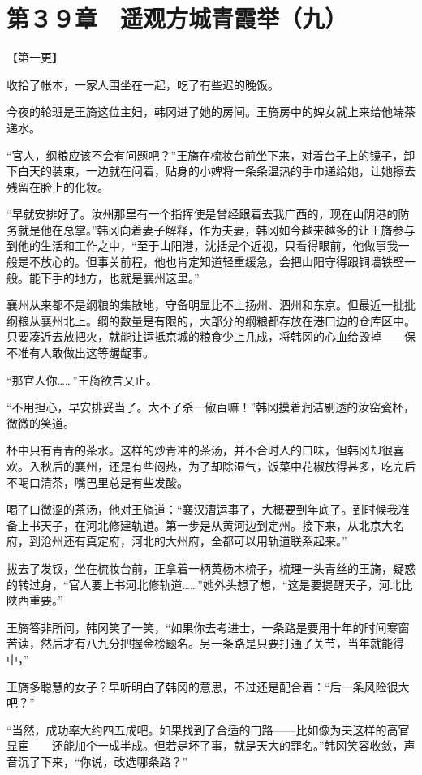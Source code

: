 \section{第３９章　遥观方城青霞举（九）}

【第一更】

收拾了帐本，一家人围坐在一起，吃了有些迟的晚饭。

今夜的轮班是王旖这位主妇，韩冈进了她的房间。王旖房中的婢女就上来给他端茶递水。

“官人，纲粮应该不会有问题吧？”王旖在梳妆台前坐下来，对着台子上的镜子，卸下白天的装束，一边就在问着，贴身的小婢将一条条温热的手巾递给她，让她擦去残留在脸上的化妆。

“早就安排好了。汝州那里有一个指挥使是曾经跟着去我广西的，现在山阴港的防务就是他在总掌。”韩冈向着妻子解释，作为夫妻，韩冈如今越来越多的让王旖参与到他的生活和工作之中，“至于山阳港，沈括是个近视，只看得眼前，他做事我一般是不放心的。但事关前程，他也肯定知道轻重缓急，会把山阳守得跟铜墙铁壁一般。能下手的地方，也就是襄州这里。”

襄州从来都不是纲粮的集散地，守备明显比不上扬州、泗州和东京。但最近一批批纲粮从襄州北上。纲的数量是有限的，大部分的纲粮都存放在港口边的仓库区中。只要凑近去放把火，就能让运抵京城的粮食少上几成，将韩冈的心血给毁掉——保不准有人敢做出这等龌龊事。

“那官人你……”王旖欲言又止。

“不用担心，早安排妥当了。大不了杀一儆百嘛！”韩冈摸着润洁剔透的汝窑瓷杯，微微的笑道。

杯中只有青青的茶水。这样的炒青冲的茶汤，并不合时人的口味，但韩冈却很喜欢。入秋后的襄州，还是有些闷热，为了却除湿气，饭菜中花椒放得甚多，吃完后不喝口清茶，嘴巴里总是有些发酸。

喝了口微涩的茶汤，他对王旖道：“襄汉漕运事了，大概要到年底了。到时候我准备上书天子，在河北修建轨道。第一步是从黄河边到定州。接下来，从北京大名府，到沧州还有真定府，河北的大州府，全都可以用轨道联系起来。”

拔去了发钗，坐在梳妆台前，正拿着一柄黄杨木梳子，梳理一头青丝的王旖，疑惑的转过身，“官人要上书河北修轨道……”她外头想了想，“这是要提醒天子，河北比陕西重要。”

王旖答非所问，韩冈笑了一笑，“如果你去考进士，一条路是要用十年的时间寒窗苦读，然后才有八九分把握金榜题名。另一条路是只要打通了关节，当年就能得中，”

王旖多聪慧的女子？早听明白了韩冈的意思，不过还是配合着：“后一条风险很大吧？”

“当然，成功率大约四五成吧。如果找到了合适的门路——比如像为夫这样的高官显宦——还能加个一成半成。但若是坏了事，就是天大的罪名。”韩冈笑容收敛，声音沉了下来，“你说，改选哪条路？”

